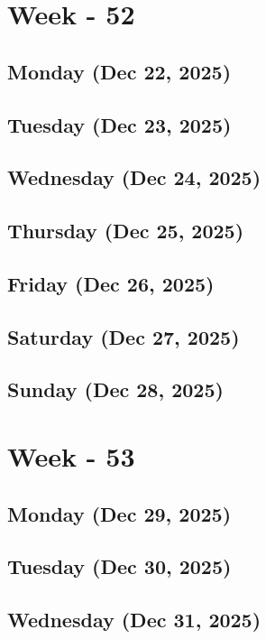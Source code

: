 \section{Week - 52}
\subsection*{Monday (Dec 22, 2025)}
\subsection*{Tuesday (Dec 23, 2025)}
\subsection*{Wednesday (Dec 24, 2025)}
\subsection*{Thursday (Dec 25, 2025)}
\subsection*{Friday (Dec 26, 2025)}
\subsection*{Saturday (Dec 27, 2025)}
\subsection*{Sunday (Dec 28, 2025)}

\section{Week - 53}
\subsection*{Monday (Dec 29, 2025)}
\subsection*{Tuesday (Dec 30, 2025)}
\subsection*{Wednesday (Dec 31, 2025)}

\newpage
\begin{spacing}{1.0}
\renewcommand{\bibname}{\bf{References}}


\end{spacing}